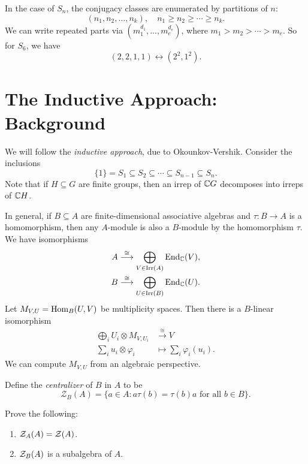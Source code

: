 \begin{remark}
  In the case of $S_n$, the conjugacy
  classes are enumerated by
  partitions of $n$:
  \[
    (n_1, n_2, \dots, n_k), \quad
    n_1 \ge n_2 \ge \cdots \ge n_k.
  \]
  We can write repeated parts via
  $(m_1^{d_1}, \dots, m_e^{d_e})$, where
  $m_1 > m_2 > \cdots > m_e$. So for
  $S_6$, we have
  \[
    (2, 2, 1, 1) \longleftrightarrow
    (2^2, 1^2).
  \]
\end{remark}

\section{The Inductive Approach: Background}

\begin{remark}
  We will follow the \emph{inductive approach},
  due to Okounkov-Vershik. Consider
  the inclusions
  \[
    \{1\} = S_1 \subseteq S_2
    \subseteq \cdots \subseteq S_{n - 1} \subseteq S_n.
  \]
  Note that if $H \subseteq G$ are finite groups,
  then an irrep of $\mathbb{C} G$ decomposes
  into irreps of $\mathbb{C} H$.

  In general, if $B \subseteq A$ are
  finite-dimensional associative algebras
  and $\tau : B \to A$ is a homomorphism,
  then any $A$-module is also a $B$-module
  by the homomorphism $\tau$.
  We have isomorphisms
  \begin{align*}
    A &\overset{\cong}{\longrightarrow} \bigoplus_{V \in \operatorname{Irr}(A)} \operatorname{End}_{\mathbb{C}}(V), \\
    B &\overset{\cong}{\longrightarrow} \bigoplus_{U \in \operatorname{Irr}(B)} \operatorname{End}_{\mathbb{C}}(U).
  \end{align*}
  Let $M_{V, U} = \operatorname{Hom}_B(U, V)$ be
  multiplicity spaces. Then there is a
  $B$-linear isomorphism
  \begin{align*}
    \bigoplus_i U_i \otimes M_{V, U_i}
    &\overset{\cong}{\longrightarrow} V \\
    \sum_i u_i \otimes \varphi_i
    &\longmapsto \sum_i \varphi_i(u_i).
  \end{align*}
  We can compute $M_{V, U}$ from
  an algebraic perspective.
\end{remark}

\begin{definition}
  Define the \emph{centralizer}
  of $B$ in $A$ to be
  \[
    \mathcal{Z}_B(A)
    = \{a \in A : a \tau(b) = \tau(b) a \text{ for all } b \in B\}.
  \]
\end{definition}

\begin{exercise}
  Prove the following:
  \begin{enumerate}
    \item $\mathcal{Z}_A(A) = \mathcal{Z}(A)$.
    \item $\mathcal{Z}_B(A)$ is a subalgebra of $A$.
  \end{enumerate}
\end{exercise}


